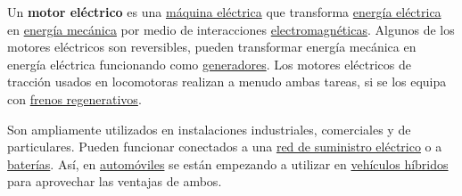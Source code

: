 \documentclass[12pt]{article}
\begin{document}
\vspace{\baselineskip}
Un \textbf{motor eléctrico} es una \href{http://es.wikipedia.org/wiki/Máquina_eléctrica}{máquina eléctrica} que transforma \href{http://es.wikipedia.org/wiki/Energía_eléctrica}{energía eléctrica} en \href{http://es.wikipedia.org/wiki/Energía_mecánica}{energía mecánica} por medio de interacciones \href{http://es.wikipedia.org/wiki/Electromagnetismo}{electromagnéticas}. Algunos de los motores eléctricos son reversibles, pueden transformar energía mecánica en energía eléctrica funcionando como \href{http://es.wikipedia.org/wiki/Generador_eléctrico}{generadores}. Los motores eléctricos de tracción usados en locomotoras realizan a menudo ambas tareas, si se los equipa con \href{http://es.wikipedia.org/wiki/Freno_regenerativo}{frenos regenerativos}.\par

Son ampliamente utilizados en instalaciones industriales, comerciales y de particulares. Pueden funcionar conectados a una \href{http://es.wikipedia.org/wiki/Red_de_suministro_eléctrico}{red de suministro eléctrico} o a \href{http://es.wikipedia.org/wiki/Batería_eléctrica}{baterías}. Así, en \href{http://es.wikipedia.org/wiki/Automóvil}{automóviles} se están empezando a utilizar en \href{http://es.wikipedia.org/wiki/Vehículo_híbrido}{vehículos híbridos} para aprovechar las ventajas de ambos.\par
\end{document}
